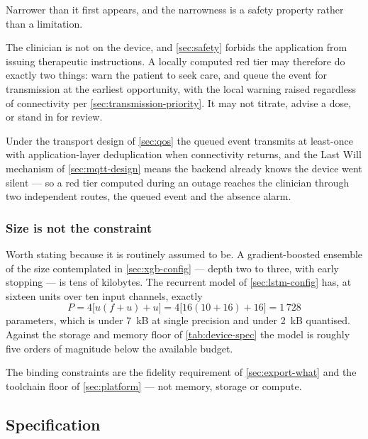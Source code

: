 \documentclass[12pt,a4paper,oneside]{report}
\begin{document}
Narrower than it first appears, and the narrowness is a safety property rather than a limitation.

The clinician is not on the device, and \cref{sec:safety} forbids the application from issuing therapeutic instructions. A locally computed red tier may therefore do exactly two things: warn the patient to seek care, and queue the event for transmission at the earliest opportunity, with the local warning raised regardless of connectivity per \cref{sec:transmission-priority}. It may not titrate, advise a dose, or stand in for review.

Under the transport design of \cref{sec:qos} the queued event transmits at least-once with application-layer deduplication when connectivity returns, and the Last Will mechanism of \cref{sec:mqtt-design} means the backend already knows the device went silent --- so a red tier computed during an outage reaches the clinician through two independent routes, the queued event and the absence alarm.

\subsubsection{Size is not the constraint}\label{sec:model-size}

Worth stating because it is routinely assumed to be. A gradient-boosted ensemble of the size contemplated in \cref{sec:xgb-config} --- depth two to three, with early stopping --- is tens of kilobytes. The recurrent model of \cref{sec:lstm-config} has, at sixteen units over ten input channels, exactly
\begin{equation}
  P = 4\bigl[u(f+u) + u\bigr] = 4\bigl[16(10+16) + 16\bigr] = 1\,728
\end{equation}
parameters, which is under 7~kB at single precision and under 2~kB quantised. Against the storage and memory floor of \cref{tab:device-spec} the model is roughly five orders of magnitude below the available budget.

The binding constraints are the fidelity requirement of \cref{sec:export-what} and the toolchain floor of \cref{sec:platform} --- not memory, storage or compute.

\subsection{Specification}\label{sec:spec44}
\end{document}

